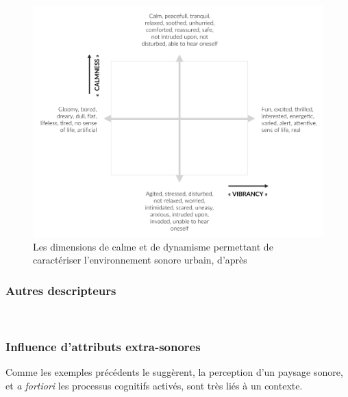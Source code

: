 {\begin{figure}[t]
        \myfloatalign
        \includegraphics[width=.8\linewidth]{gfx/ch_3/calmVibran}
        \caption{Les dimensions de calme et de dynamisme permettant de caractériser l'environnement sonore urbain, d'après \citep{cain2013development}}\label{fig:calmVibran}
\end{figure}

\subsubsection{Autres descripteurs}

 \\

\subsubsection{Influence d'attributs extra-sonores}
\label{sec:ch3_contexteDimension}

Comme les exemples précédents le suggèrent, la perception d'un paysage sonore, et \emph{a fortiori} les processus cognitifs activés, sont très liés à un contexte.

}
